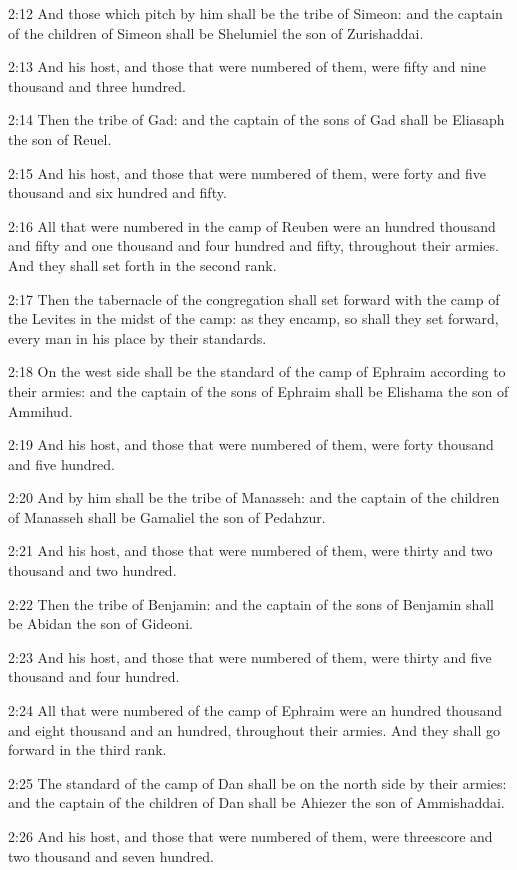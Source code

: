 2:12 And those which pitch by him shall be the tribe of Simeon: and
the captain of the children of Simeon shall be Shelumiel the son of
Zurishaddai.

2:13 And his host, and those that were numbered of them, were fifty
and nine thousand and three hundred.

2:14 Then the tribe of Gad: and the captain of the sons of Gad shall
be Eliasaph the son of Reuel.

2:15 And his host, and those that were numbered of them, were forty
and five thousand and six hundred and fifty.

2:16 All that were numbered in the camp of Reuben were an hundred
thousand and fifty and one thousand and four hundred and fifty,
throughout their armies. And they shall set forth in the second rank.

2:17 Then the tabernacle of the congregation shall set forward with
the camp of the Levites in the midst of the camp: as they encamp, so
shall they set forward, every man in his place by their standards.

2:18 On the west side shall be the standard of the camp of Ephraim
according to their armies: and the captain of the sons of Ephraim
shall be Elishama the son of Ammihud.

2:19 And his host, and those that were numbered of them, were forty
thousand and five hundred.

2:20 And by him shall be the tribe of Manasseh: and the captain of the
children of Manasseh shall be Gamaliel the son of Pedahzur.

2:21 And his host, and those that were numbered of them, were thirty
and two thousand and two hundred.

2:22 Then the tribe of Benjamin: and the captain of the sons of
Benjamin shall be Abidan the son of Gideoni.

2:23 And his host, and those that were numbered of them, were thirty
and five thousand and four hundred.

2:24 All that were numbered of the camp of Ephraim were an hundred
thousand and eight thousand and an hundred, throughout their armies.
And they shall go forward in the third rank.

2:25 The standard of the camp of Dan shall be on the north side by
their armies: and the captain of the children of Dan shall be Ahiezer
the son of Ammishaddai.

2:26 And his host, and those that were numbered of them, were
threescore and two thousand and seven hundred.

